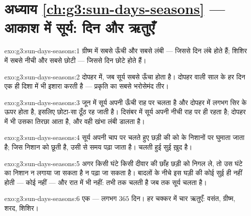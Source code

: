 \section*{अध्याय \ref{ch:g3:sun-days-seasons} --- आकाश में सूर्य: दिन और ऋतुएँ}

\begin{solution}{exo:g3:sun-days-seasons:1}
ग्रीष्म में सबसे ऊँची और सबसे लंबी --- जिससे दिन लंबे होते हैं;
शिशिर में सबसे नीची और सबसे छोटी --- जिससे दिन छोटे होते हैं।
\end{solution}

\begin{solution}{exo:g3:sun-days-seasons:2}
दोपहर में, जब सूर्य सबसे ऊँचा होता है। दोपहर वाली  साल के हर दिन
एक ही दिशा में भी इशारा करती है --- प्रकृति का सबसे भरोसेमंद तीर।
\end{solution}

\begin{solution}{exo:g3:sun-days-seasons:3}
जून में सूर्य अपनी ऊँची राह पर चलता है और दोपहर में लगभग सिर के ऊपर
होता है, इसलिए  छोटा-सा ठूँठ रह जाती है। दिसंबर में सूर्य अपनी
नीची राह पर ही रहता है; दोपहर में भी उसका  तिरछा आता है, और वही
खंभा लंबी  डालता है।
\end{solution}

\begin{solution}{exo:g3:sun-days-seasons:4}
सूर्य अपनी चाप पर चलते हुए छड़ी की  को  के निशानों पर घुमाता
जाता है;  जिस निशान को छूती है, उसी से समय पढ़ा जाता है। चलती हुई
सुई ख़ुद  है।
\end{solution}

\begin{solution}{exo:g3:sun-days-seasons:5}
अगर किसी घंटे किसी दीवार की छाँह छड़ी को निगल ले, तो उस घंटे का
निशान न लगाया जा सकता है न पढ़ा जा सकता है। बादलों के नीचे इस घड़ी की
कोई सुई ही नहीं होती --- कोई  नहीं --- और रात में भी नहीं:
 तभी तक चलती है जब तक सूर्य चलता है।
\end{solution}

\begin{solution}{exo:g3:sun-days-seasons:6}
एक  --- लगभग $365$ दिन। हर चक्कर में चार ऋतुएँ: वसंत, ग्रीष्म,
शरद, शिशिर।
\end{solution}


